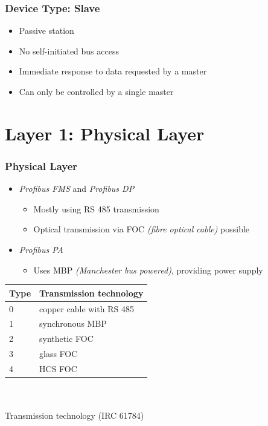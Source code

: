 \documentclass{beamer}
\begin{document}
\begin{frame}
  \frametitle{Device Type: Slave}
  \begin{itemize}
    \item Passive station
    \item No self-initiated bus access
    \item Immediate response to data requested by a master
    \item Can only be controlled by a single master
  \end{itemize}
\end{frame}

\section{Layer 1: Physical Layer}
\begin{frame}
  \frametitle{Physical Layer}
  \begin{itemize}
    \item \textit{Profibus FMS} and \textit{Profibus DP}
      \begin{itemize}
        \item Mostly using RS 485 transmission
        \item Optical transmission via FOC \textit{(fibre optical cable)} possible
      \end{itemize}
    \item \textit{Profibus PA}
      \begin{itemize}
        \item Uses MBP \textit{(Manchester bus powered)}, providing power supply
      \end{itemize}
  \end{itemize}
  \center
  \footnotesize
  \begin{tabular}[h]{l|l}
    \textbf{Type} & \textbf{Transmission technology} \\
    \hline
    0             & copper cable with RS 485 \\
    1             & synchronous MBP \\
    2             & synthetic FOC \\
    3             & glass FOC \\
    4             & HCS FOC
  \end{tabular} \\
  \hfill \\
  \normalsize
  Transmission technology (IRC 61784)~\cite{profibusmanual}
\end{frame}
\end{document}
